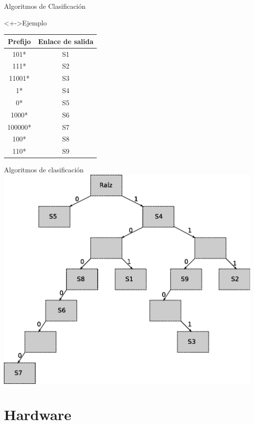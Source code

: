 \documentclass[xcolor=dvipsnames]{beamer}
\begin{document}
\begin{frame}{Algoritmos de Clasificación}
  \begin{block}<+->{Ejemplo}   
	\begin{center}
	\begin{tabular}{|c|c|} \hline
		\textbf{Prefijo} & \textbf{Enlace de salida} \\ \hline
		101* & S1 \\
		111* & S2 \\
		11001* & S3 \\
		1* & S4 \\
		0* & S5 \\
		1000* & S6 \\
		100000* & S7 \\
		100* & S8 \\
		110* & S9 \\	\hline
	\end{tabular}	
\end{center}

  \end{block}
\end{frame}

\begin{frame}{Algoritmos de clasificación}
\center 
\includegraphics[scale=0.40]{figures/trie.eps}
\end{frame}

\section{Hardware}
\end{document}
